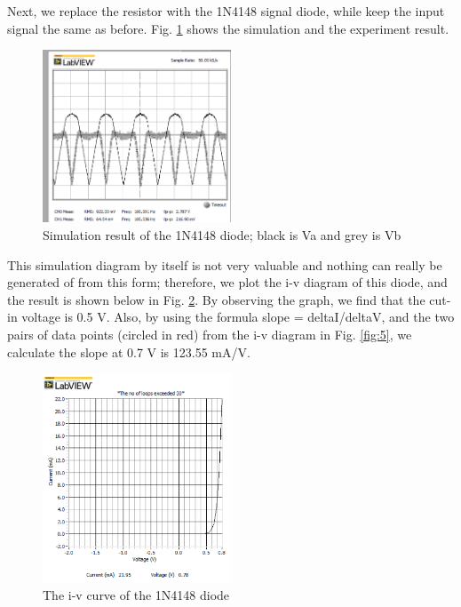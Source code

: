 \documentclass[letterpaper, 10 pt, conference]{ieeeconf}  %
\begin{document}
\par Next, we replace the resistor with the 1N4148 signal diode, while keep the input signal the same as before. Fig. \ref{fig:3} shows the simulation and the experiment result.
	\begin{figure}[h]
        \centering
        \includegraphics[width=0.5\textwidth]{images/result2.png}
        \caption{Simulation result of the 1N4148 diode; black is Va and grey is Vb}
		\label{fig:3}
    \end{figure}
\par This simulation diagram by itself is not very valuable and nothing can really be generated of from this form; therefore, we plot the i-v diagram of this diode, and the result is shown below in Fig. \ref{fig:4}. By observing the graph, we find that the cut-in voltage is 0.5 V. Also, by using the formula slope = deltaI/deltaV, and the two pairs of data points (circled in red) from the i-v diagram in Fig. \ref{fig:5}, we calculate the slope at 0.7 V is 123.55 mA/V.
	\begin{figure}[h]
        \centering
        \includegraphics[width=0.5\textwidth]{images/result3.png}
        \caption{The i-v curve of the 1N4148 diode}
		\label{fig:4}
    \end{figure}
\end{document}
